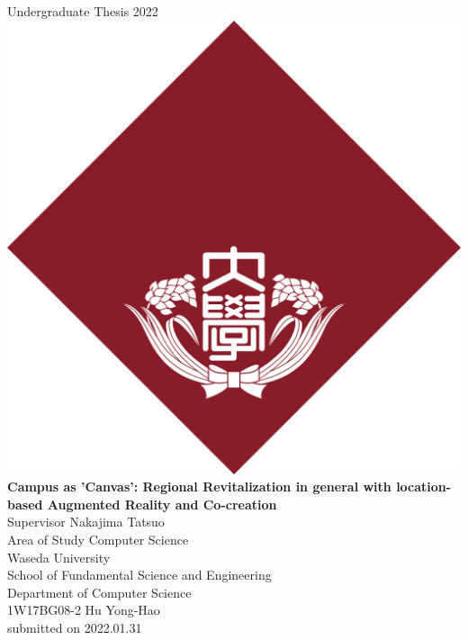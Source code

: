 \documentclass[a4paper, 12pt, oneside]{book}
\begin{document}

\begin{titlepage}
\begin{center}
    \vspace{0.1\textheight}
    {\Large Undergraduate Thesis 2022} \\
    \vspace{0.05\textheight}
    \includegraphics[width=48truemm]{resources/0_title/waseda_logo.png} \\
    \vspace{0.05\textheight}
    \textbf{\huge Campus as 'Canvas': Regional Revitalization in general with location-based Augmented Reality and Co-creation} \\
    \vfill
    {\Large Supervisor \hspace{0.02\textwidth} Nakajima Tatsuo} \\
    {\Large Area of Study \hspace{0.02\textwidth} Computer Science} \\
    \vspace{0.05\textheight}
    {\Large 
        Waseda University \\
        School of Fundamental Science and Engineering \\
        Department of Computer Science \\}
    \vspace{0.05\textheight}
    {\Large 1W17BG08-2 Hu Yong-Hao \\}
    \vspace{0.05\textheight}
    {submitted on 2022.01.31}
\end{center}
\end{titlepage}
\end{document}
